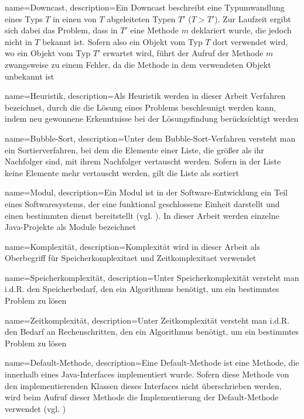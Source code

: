 {
    name=Downcast,
    description={Ein Downcast beschreibt eine Typumwandlung eines Typs $T$ in einen von $T$ abgeleiteten Typen $T'$ ($T > T'$). Zur Laufzeit ergibt sich dabei das Problem, dass in $T'$ eine Methode $m$ deklariert wurde, die jedoch nicht in $T$ bekannt ist. Sofern also ein Objekt vom Typ $T$ dort verwendet wird, wo ein Objekt vom Typ $T'$ erwartet wird, führt der Aufruf der Methode $m$ zwangsweise zu einem Fehler, da die Methode in dem verwendeten Objekt unbekannt ist
}}

{
    name=Heuristik,
    description={Als Heuristik werden in dieser Arbeit Verfahren bezeichnet, durch die die Lösung eines Problems beschleunigt werden kann, indem neu gewonnene Erkenntnisse bei der Lösungsfindung berücksichtigt werden}
   }

{
    name=Bubble-Sort,
    description={Unter dem Bubble-Sort-Verfahren versteht man ein Sortierverfahren, bei dem die Elemente einer Liste, die größer als ihr Nachfolger sind, mit ihrem Nachfolger vertauscht werden. Sofern in der Liste keine Elemente mehr vertauscht werden, gilt die Liste als sortiert
    }
}

{
    name=Modul,
    description={Ein Modul ist in der Software-Entwicklung ein Teil eines Softwaresystems, der eine funktional geschlossene Einheit darstellt und einen bestimmten dienst bereitstellt (vgl. \cite{modul}). In dieser Arbeit werden einzelne Java-Projekte als Module bezeichnet}
}

{
    name=Komplexität,
    description={Komplexität wird in dieser Arbeit als Oberbegriff für \Gls{Speicherkomplexitaet} und \Gls{Zeitkomplexitaet} verwendet
    }
}


{
    name=Speicherkomplexität,
    description={Unter Speicherkomplexität versteht man i.d.R. den Speicherbedarf, den ein Algorithmus benötigt, um ein bestimmtes Problem zu lösen}
}


{
    name=Zeitkomplexität,
    description={Unter Zeitkomplexität versteht man i.d.R. den Bedarf an Rechenschritten, den ein Algorithmus benötigt, um ein bestimmtes Problem zu lösen}
}

{
    name=Default-Methode,
    description={Eine Default-Methode ist eine Methode, die innerhalb eines Java-\Gls{Interface}s implementiert wurde. Sofern diese Methode von den implementierenden Klassen dieses \Gls{Interface}s nicht überschrieben werden, wird beim Aufruf dieser Methode die Implementierung der Default-Methode verwendet (vgl. \cite{conversions_and_promotions})
    }
}
